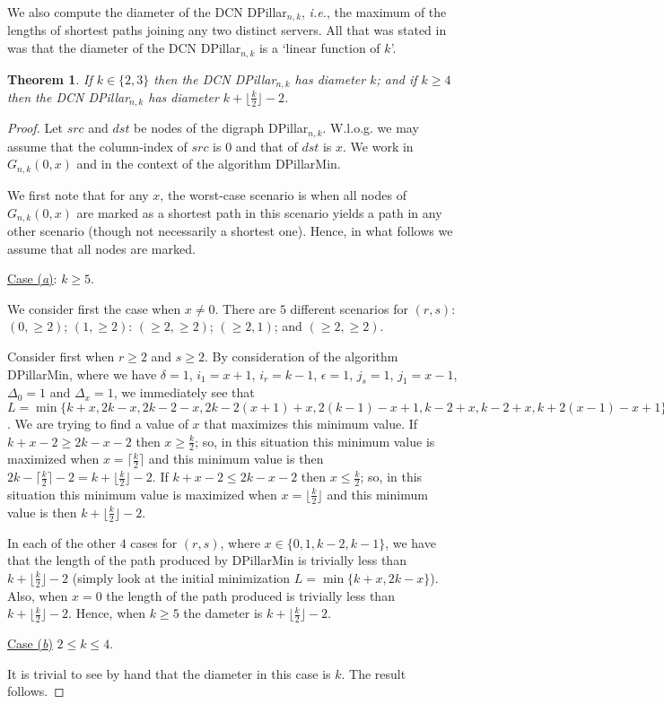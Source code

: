 \documentclass{article}
\newtheorem{theorem}[definition]{Theorem}
\begin{document}
We also compute the diameter of the DCN DPillar$_{n,k}$, \emph{i.e.}, the maximum of the lengths of shortest paths joining any two distinct servers. All that was stated in \cite{LYY12} was that the diameter of the DCN DPillar$_{n,k}$ is a `linear function of $k$'.

\begin{theorem}\label{thm:diam}
If $k\in\{2,3\}$ then the DCN DPillar$_{n,k}$ has diameter $k$; and if $k\geq 4$ then the DCN DPillar$_{n,k}$ has diameter $k+\lfloor\frac{k}{2}\rfloor-2$.
\end{theorem}

\begin{proof}Let $src$ and $dst$ be nodes of the digraph DPillar$_{n,k}$. W.l.o.g. we may assume that the column-index of $src$ is $0$ and that of $dst$ is $x$. We work in $G_{n,k}(0,x)$ and in the context of the algorithm DPillarMin.

We first note that for any $x$, the worst-case scenario is when all nodes of $G_{n,k}(0,x)$ are marked as a shortest path in this scenario yields a path in any other scenario (though not necessarily a shortest one). Hence, in what follows we assume that all nodes are marked.\medskip

\noindent\underline{Case (\emph{a\/})}: $k\geq 5$.\smallskip

\noindent We consider first the case when $x\neq 0$. There are $5$ different scenarios for $(r,s)$: $(0,\geq 2)$; $(1,\geq 2)$: $(\geq 2,\geq 2)$; $(\geq 2,1)$; and $(\geq 2,\geq 2)$.

Consider first when $r\geq 2$ and $s\geq 2$. By consideration of the algorithm DPillarMin, where we have $\delta=1$, $i_1=x+1$, $i_r=k-1$, $\epsilon=1$, $j_s=1$, $j_1=x-1$, $\Delta_0=1$ and $\Delta_x=1$, we immediately see that $L = \min\{k+x,2k-x,2k-2-x,2k-2(x+1)+x,2(k-1)-x+1,k-2+x,k-2+x,k+2(x-1)-x+1\} = \min\{k+x-2,2k-x-2\}$. We are trying to find a value of $x$ that maximizes this minimum value. If $k+x-2 \geq 2k-x-2$ then $x \geq \frac{k}{2}$; so, in this situation this minimum value is maximized when $x=\lceil\frac{k}{2}\rceil$ and this minimum value is then $2k-\lceil\frac{k}{2}\rceil-2 = k+\lfloor\frac{k}{2}\rfloor-2$. If $k+x-2 \leq 2k-x-2$ then $x \leq \frac{k}{2}$; so, in this situation this minimum value is maximized when $x=\lfloor\frac{k}{2}\rfloor$ and this minimum value is then $k+\lfloor\frac{k}{2}\rfloor-2$.

In each of the other $4$ cases for $(r,s)$, where $x\in\{0,1,k-2,k-1\}$, we have that the length of the path produced by DPillarMin is trivially less than $k+\lfloor\frac{k}{2}\rfloor-2$ (simply look at the initial minimization $L=\min\{k+x,2k-x\}$). Also, when $x=0$ the length of the path produced is trivially less than  $k+\lfloor\frac{k}{2}\rfloor-2$. Hence, when $k\geq 5$ the dameter is $k+\lfloor\frac{k}{2}\rfloor-2$.\smallskip

\noindent\underline{Case (\emph{b\/})} $2\leq k\leq 4$.\smallskip

\noindent It is trivial to see by hand that the diameter in this case is $k$. The result follows.
\end{proof}
\end{document}
